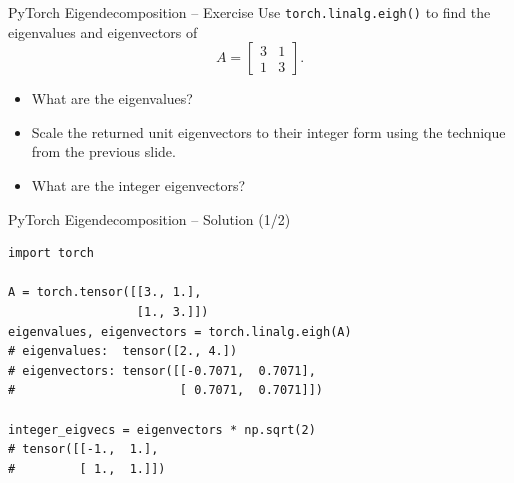 \documentclass{beamer}
\begin{document}
\begin{frame}{PyTorch Eigendecomposition -- Exercise}
  Use \texttt{torch.linalg.eigh()} to find the eigenvalues and eigenvectors of
  \begin{equation}
    A = \begin{bmatrix} 3 & 1 \\ 1 & 3 \end{bmatrix}.
  \end{equation}
  \begin{itemize}
    \item What are the eigenvalues?
    \item Scale the returned unit eigenvectors to their integer form using the technique from the previous slide.
    \item What are the integer eigenvectors?
  \end{itemize}
\end{frame}

\begin{frame}[fragile]{PyTorch Eigendecomposition -- Solution (1/2)}
  \begin{lstlisting}
import torch

A = torch.tensor([[3., 1.],
                  [1., 3.]])
eigenvalues, eigenvectors = torch.linalg.eigh(A)
# eigenvalues:  tensor([2., 4.])
# eigenvectors: tensor([[-0.7071,  0.7071],
#                       [ 0.7071,  0.7071]])

integer_eigvecs = eigenvectors * np.sqrt(2)
# tensor([[-1.,  1.],
#         [ 1.,  1.]])
  \end{lstlisting}
\end{frame}
\end{document}
